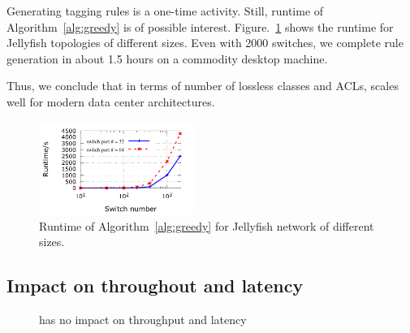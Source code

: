 Generating tagging rules is a one-time activity. Still, runtime of
Algorithm~\ref{alg:greedy} is of possible interest.
Figure.~\ref{fig:algo_runtime} shows the runtime for Jellyfish topologies of
different sizes. Even with 2000 switches, we complete rule generation in about
1.5 hours on a commodity desktop machine.

Thus, we conclude that in terms of number of lossless classes and ACLs,
\sysname{} scales well for modern data center architectures.

\begin{figure}
	\centering
	\includegraphics[width=0.45\textwidth] {figs/algo_runtime}
	\caption{Runtime of Algorithm~\ref{alg:greedy} for Jellyfish network of different sizes.}
	\label{fig:algo_runtime}
	\vspace{-0.25in}
\end{figure}

\subsection{Impact on throughout and latency}\label{subsec:exp_performanceoverhead}

\begin{figure}[t]
	\centering
	
	
		\caption{\sysname{} has no impact on throughput and latency}
		\label{fig:perf_penalty}
	\vspace{-0.25in}
\end{figure}

